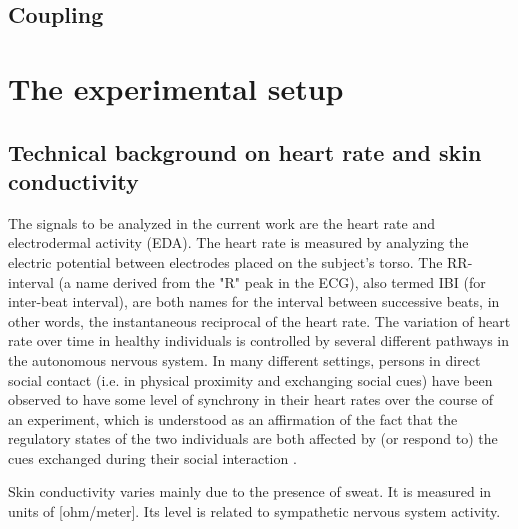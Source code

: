 \documentclass[a4paper, 11pt]{report}      %
\begin{document}
\subsection{Coupling }


\section{The experimental setup}

\subsection{Technical background on heart rate and skin \mbox{conductivity}}
The signals to be analyzed in the current work are the heart rate and electrodermal activity (EDA). 
The heart rate is measured by analyzing the electric potential between electrodes placed on the subject's torso. The RR-interval (a name derived from the "R" peak in the ECG), also termed IBI (for inter-beat interval), are both names for the interval between successive beats, in other words, the instantaneous reciprocal of the heart rate. The variation of heart rate over time in healthy individuals is controlled by several different pathways in the autonomous nervous system. In many different settings, persons in direct social contact (i.e. in physical proximity and exchanging social cues) have been observed to have some level of synchrony in their heart rates over the course of an experiment, which is understood as an affirmation of the fact that the regulatory states of the two individuals are both affected by (or respond to) the cues exchanged during their social interaction \citep{palumbo2017interpersonal}.

Skin conductivity varies mainly due to the presence of sweat. It is measured in units of [ohm\slash meter]. Its level is related to sympathetic nervous system activity.
\end{document}
